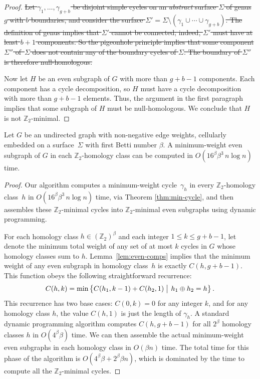 \documentclass[letterpaper,review]{siamart190516}
\def\Z{\mathbb{Z}}
\begin{document}
{\begin{proof}
\sout{Let $\gamma_1, \dots, \gamma_{g+b}$ be disjoint simple cycles on an \emph{abstract} surface $\Sigma$ of genus $g$ with $b$ boundaries, and consider the surface $\Sigma' = \Sigma \setminus (\gamma_1 \cup \cdots \cup \gamma_{g+b})$.  The definition of genus implies that $\Sigma'$ cannot be connected; indeed, $\Sigma'$ must have at least $b+1$ components.  So the pigeonhole principle implies that some component $\Sigma''$ of~$\Sigma$ does not contain any of the boundary cycles of $\Sigma$.  The boundary of $\Sigma''$ is therefore null-homologous.}

Now let $H$ be an even subgraph of $G$ with more than $g+b-1$ components.  Each component has a cycle decomposition, so $H$ must have a cycle decomposition with more than $g+b-1$ elements.  Thus, the argument in the first paragraph implies that some subgraph of $H$ must be null-homologous.  We conclude that $H$ is not $\Z_2$-minimal.
\end{proof}

\begin{theorem}
\label{thm:min-even}
Let $G$ be an undirected graph with non-negative edge weights, cellularly embedded on a
surface~$\Sigma$ with first Betti number $\beta$.  A minimum-weight even subgraph of $G$ in each
$\Z_2$-homology class can be computed in $O(16^\beta \beta^3\, n\log n)$ time.
\end{theorem}

\begin{proof}
Our algorithm computes a minimum-weight cycle~$\gamma_h$ in every $\Z_2$-homology class~$h$ in $O(16^\beta \beta^3\, n\log n)$ time, via Theorem \ref{thm:min-cycle}, and then assembles these $\Z_2$-minimal cycles into $\Z_2$-minimal even subgraphs using dynamic programming.

For each homology class $h\in (\Z_2)^\beta$ and each integer $1\le k\le g+b-1$, let  denote the minimum total weight of any set of at most $k$ cycles in $G$ whose homology classes sum to $h$.  Lemma~\ref{lem:even-comps} implies that the minimum weight of any even subgraph in homology class~$h$ is exactly $C(h, g+b-1)$.  This function obeys the following straightforward recurrence:
\[
	C(h,k) = \min\Setbar{C(h_1,k-1) + C(h_2, 1)\strut}{h_1\oplus h_2 = h}.
\]
This recurrence has two base cases: $C(0, k) = 0$ for any integer $k$, and for any homology class $h$, the value $C(h,1)$ is just the length of $\gamma_h$.  A standard dynamic programming algorithm computes $C(h, g+b-1)$ for all $2^\beta$ homology classes $h$ in $O(4^\beta \beta)$ time.  We can then assemble the actual minimum-weight even subgraphs in each homology class in $O(\beta n)$ time.  The total time for this phase of the algorithm is $O(4^\beta \beta + 2^\beta \beta n)$, which is dominated by the time to compute all the $\Z_2$-minimal cycles.
\end{proof}

}
\end{document}
